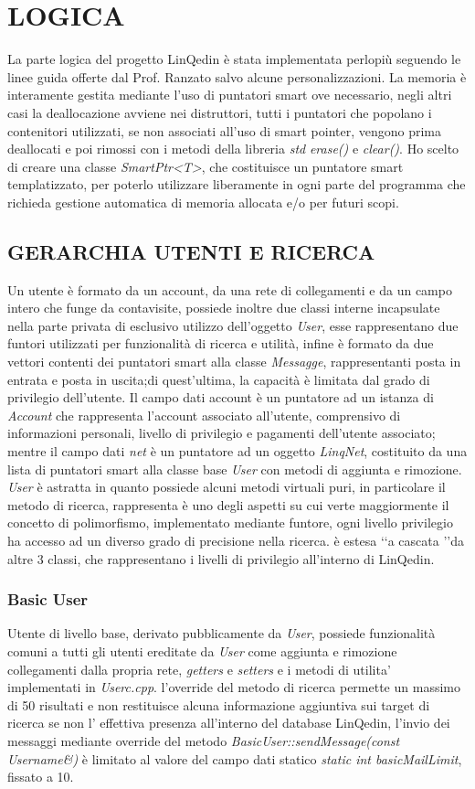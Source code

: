 \section*{LOGICA}
La parte logica del progetto LinQedin è stata implementata perlopiù seguendo le linee guida offerte dal Prof. Ranzato salvo alcune personalizzazioni. La memoria
è interamente gestita mediante l'uso di puntatori smart ove necessario, negli altri casi la deallocazione avviene nei distruttori, tutti i puntatori che popolano i contenitori
utilizzati, se non associati all'uso di smart pointer, vengono prima deallocati e poi rimossi con i metodi della libreria \textit{std} \textit{erase()} e \textit{clear()}.
Ho scelto di creare una classe \textit{SmartPtr<T>}, che costituisce un puntatore smart templatizzato, per poterlo utilizzare liberamente in ogni parte del programma che richieda
gestione automatica di memoria allocata e/o per futuri scopi.
\subsection*{GERARCHIA UTENTI E RICERCA}
Un utente è formato da un account, da una rete di collegamenti e da un campo intero che funge da contavisite, possiede inoltre due classi interne
incapsulate nella parte privata di esclusivo utilizzo dell'oggetto \textit{User}, esse rappresentano due funtori utilizzati per funzionalità di
ricerca e utilità, infine è formato da due vettori contenti dei puntatori smart alla classe \textit{Messagge}, rappresentanti posta in entrata e posta in uscita;di quest'ultima, la capacità
è limitata dal grado di privilegio dell'utente.
Il campo dati account è un puntatore ad un istanza di \textit{Account} che rappresenta l'account associato all'utente, comprensivo di informazioni
personali, livello di privilegio e pagamenti dell'utente associato; mentre il campo dati \textit{net} è un puntatore ad un oggetto \textit{LinqNet},
costituito da una lista di puntatori smart alla classe base \textit{User} con metodi di aggiunta e rimozione.
\textit{User} è astratta in quanto possiede alcuni metodi virtuali puri, in particolare il metodo di ricerca, rappresenta è uno degli aspetti su cui verte maggiormente il concetto di polimorfismo, implementato mediante funtore,
ogni livello privilegio ha accesso ad un diverso grado di precisione nella ricerca. è estesa \lq\lq a cascata \rq\rq da altre 3 classi, che rappresentano
i livelli di privilegio all'interno di LinQedin.
\subsubsection*{Basic User}
Utente di livello base, derivato pubblicamente da \textit{User}, possiede funzionalità comuni a tutti gli utenti ereditate da \textit{User} come aggiunta e rimozione collegamenti dalla propria rete, \textit{getters} e \textit{setters} e i metodi di utilita' implementati in \textit{Userc.cpp}. l'override del metodo
di ricerca permette un massimo di 50 risultati e non restituisce alcuna informazione aggiuntiva sui target di ricerca se non l' effettiva
presenza all'interno del database LinQedin, l'invio dei messaggi mediante override del metodo \textit{BasicUser::sendMessage(const Username\&)} è limitato al valore del campo dati statico \textit{static int basicMailLimit}, fissato a 10.
